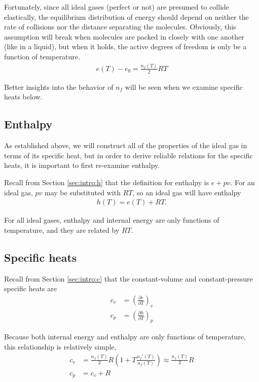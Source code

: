Fortunately, since all ideal gases (perfect or not) are presumed to collide elastically, the equilibrium distribution of energy should depend on neither the rate of collisions nor the distance separating the molecules.  Obviously, this assumption will break when molecules are packed in closely with one another (like in a liquid), but when it holds, the active degrees of freedom is only be a function of temperature.
\begin{align}
e(T) - e_0 = \frac{n_f(T)}{2} R T \label{eqn:ig:efromt}
\end{align}

Better insights into the behavior of $n_f$ will be seen when we examine specific heats below.

\subsection{Enthalpy}\label{sec:ig:h}

As established above, we will construct all of the properties of the ideal gas in terms of its specific heat, but in order to derive reliable relations for the specific heats, it is important to first re-examine enthalpy.

Recall from Section \ref{sec:intro:h} that the definition for enthalpy is $e + pv$.  For an ideal gas, $pv$ may be substituted with $R T$, so an ideal gas will have enthalpy
\begin{align}
h(T) = e(T) + RT.\label{eqn:ig:hfrome}
\end{align}

For all ideal gases, enthalpy and internal energy are only functions of temperature, and they are related by $RT$.

\subsection{Specific heats}\label{sec:ig:c}

Recall from Section \ref{sec:intro:c} that the constant-volume and constant-pressure specific heats are
\begin{align}
c_v &= \left( \frac{\partial e}{\partial T} \right)_v\nonumber\\
c_p &= \left( \frac{\partial h}{\partial T} \right)_p\nonumber
\end{align}

Because both internal energy and enthalpy are only functions of temperature, this relationship is relatively simple,
\begin{align}
c_v &= \frac{n_f(T)}{2} R \left( 1 + T\frac{n_f'(T)}{n_f(T)}\right) \approx \frac{n_f(T)}{2} R \label{eqn:ig:cvfromt}\\
c_p &= c_v + R
\end{align}

